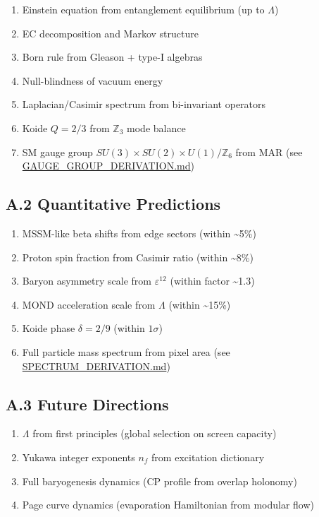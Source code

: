 \begin{enumerate}
\def\labelenumi{\arabic{enumi}.}
\tightlist
\item
  Einstein equation from entanglement equilibrium (up to \(\Lambda\))
\item
  EC decomposition and Markov structure
\item
  Born rule from Gleason + type-I algebras
\item
  Null-blindness of vacuum energy
\item
  Laplacian/Casimir spectrum from bi-invariant operators
\item
  Koide \(Q = 2/3\) from \(\mathbb{Z}_3\) mode balance
\item
  SM gauge group \(SU(3) \times SU(2) \times U(1)/\mathbb{Z}_6\) from MAR (see \url{GAUGE_GROUP_DERIVATION.md})
\end{enumerate}

\subsection{A.2 Quantitative Predictions}\label{a2-quantitative-predictions}

\begin{enumerate}
\def\labelenumi{\arabic{enumi}.}
\tightlist
\item
  MSSM-like beta shifts from edge sectors (within \textasciitilde5\%)
\item
  Proton spin fraction from Casimir ratio (within \textasciitilde8\%)
\item
  Baryon asymmetry scale from \(\varepsilon^{12}\) (within factor \textasciitilde1.3)
\item
  MOND acceleration scale from \(\Lambda\) (within \textasciitilde15\%)
\item
  Koide phase \(\delta = 2/9\) (within \(1\sigma\))
\item
  Full particle mass spectrum from pixel area (see \url{SPECTRUM_DERIVATION.md})
\end{enumerate}

\subsection{A.3 Future Directions}\label{a3-future-directions}

\begin{enumerate}
\def\labelenumi{\arabic{enumi}.}
\tightlist
\item
  \(\Lambda\) from first principles (global selection on screen capacity)
\item
  Yukawa integer exponents \(n_f\) from excitation dictionary
\item
  Full baryogenesis dynamics (CP profile from overlap holonomy)
\item
  Page curve dynamics (evaporation Hamiltonian from modular flow)
\end{enumerate}

